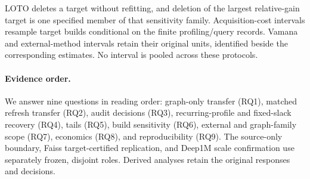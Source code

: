 LOTO deletes a target without refitting, and deletion of the largest relative-gain target is one specified member of that sensitivity family. Acquisition-cost intervals resample target builds conditional on the finite profiling/query records. Vamana and external-method intervals retain their original units, identified beside the corresponding estimates. No interval is pooled across these protocols.

\paragraph{Evidence order.}
We answer nine questions in reading order: graph-only transfer (RQ1), matched refresh transfer (RQ2), audit decisions (RQ3), recurring-profile and fixed-slack recovery (RQ4), tails (RQ5), build sensitivity (RQ6), external and graph-family scope (RQ7), economics (RQ8), and reproducibility (RQ9). The source-only boundary, Faiss target-certified replication, and Deep1M scale confirmation use separately frozen, disjoint roles. Derived analyses retain the original responses and decisions.
